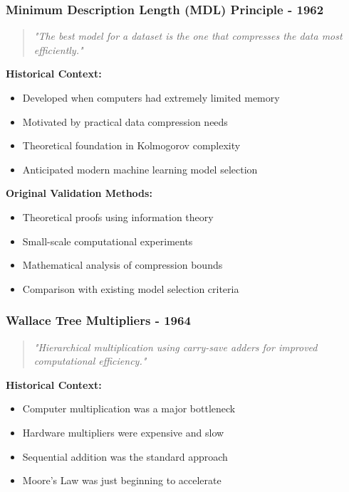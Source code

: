 \subsubsection{Minimum Description Length (MDL) Principle - 1962}

\begin{quote}
\textit{"The best model for a dataset is the one that compresses the data most efficiently."}
\end{quote}

\textbf{Historical Context:}
\begin{itemize}
    \item Developed when computers had extremely limited memory
    \item Motivated by practical data compression needs
    \item Theoretical foundation in Kolmogorov complexity
    \item Anticipated modern machine learning model selection
\end{itemize}

\textbf{Original Validation Methods:}
\begin{itemize}
    \item Theoretical proofs using information theory
    \item Small-scale computational experiments
    \item Mathematical analysis of compression bounds
    \item Comparison with existing model selection criteria
\end{itemize}

\subsubsection{Wallace Tree Multipliers - 1964}

\begin{quote}
\textit{"Hierarchical multiplication using carry-save adders for improved computational efficiency."}
\end{quote}

\textbf{Historical Context:}
\begin{itemize}
    \item Computer multiplication was a major bottleneck
    \item Hardware multipliers were expensive and slow
    \item Sequential addition was the standard approach
    \item Moore's Law was just beginning to accelerate
\end{itemize}

